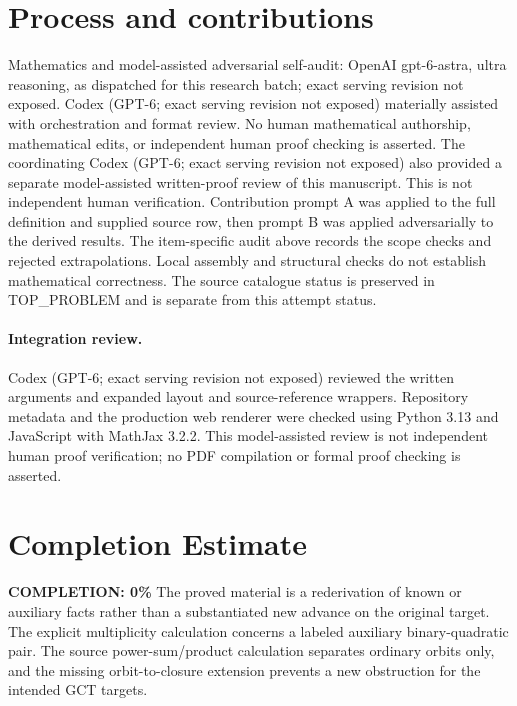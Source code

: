 \documentclass[11pt]{article}
\begin{document}
\section{Process and contributions}
Mathematics and model-assisted adversarial self-audit: OpenAI gpt-6-astra, ultra reasoning, as dispatched for this research batch; exact serving revision not exposed. Codex (GPT-6; exact serving revision not exposed) materially assisted with orchestration and format review. No human mathematical authorship, mathematical edits, or independent human proof checking is asserted.
The coordinating Codex (GPT-6; exact serving revision not exposed) also provided a separate model-assisted written-proof review of this manuscript. This is not independent human verification.
Contribution prompt A was applied to the full definition and supplied source row, then prompt B was applied adversarially to the derived results. The item-specific audit above records the scope checks and rejected extrapolations. Local assembly and structural checks do not establish mathematical correctness. The source catalogue status is preserved in TOP\_PROBLEM and is separate from this attempt status.
\paragraph{Integration review.} Codex (GPT-6; exact serving revision not exposed) reviewed the written arguments and expanded layout and source-reference wrappers. Repository metadata and the production web renderer were checked using Python 3.13 and JavaScript with MathJax 3.2.2. This model-assisted review is not independent human proof verification; no PDF compilation or formal proof checking is asserted.

\section{Completion Estimate}
\noindent\textbf{COMPLETION: 0\%}
The proved material is a rederivation of known or auxiliary facts rather than a substantiated new advance on the original target. The explicit multiplicity calculation concerns a labeled auxiliary binary-quadratic pair. The source power-sum/product calculation separates ordinary orbits only, and the missing orbit-to-closure extension prevents a new obstruction for the intended GCT targets.
\end{document}
